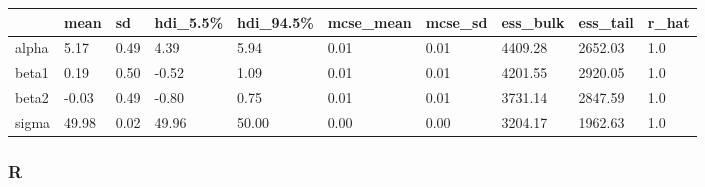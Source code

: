 \documentclass[
  letterpaper,
  DIV=11,
  numbers=noendperiod]{scrartcl}
\begin{document}
\begin{longtable}[]{@{}llllllllll@{}}
\toprule\noalign{}
& mean & sd & hdi\_5.5\% & hdi\_94.5\% & mcse\_mean & mcse\_sd &
ess\_bulk & ess\_tail & r\_hat \\
\midrule\noalign{}
\endhead
\bottomrule\noalign{}
\endlastfoot
alpha & 5.17 & 0.49 & 4.39 & 5.94 & 0.01 & 0.01 & 4409.28 & 2652.03 &
1.0 \\
beta1 & 0.19 & 0.50 & -0.52 & 1.09 & 0.01 & 0.01 & 4201.55 & 2920.05 &
1.0 \\
beta2 & -0.03 & 0.49 & -0.80 & 0.75 & 0.01 & 0.01 & 3731.14 & 2847.59 &
1.0 \\
sigma & 49.98 & 0.02 & 49.96 & 50.00 & 0.00 & 0.00 & 3204.17 & 1962.63 &
1.0 \\
\end{longtable}

\subsubsection{R}
\end{document}
